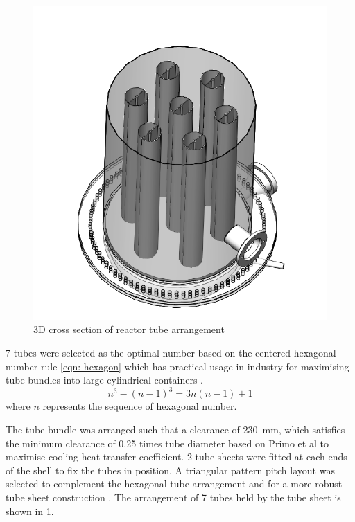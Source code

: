 \begin{figure}
    \centering
    \includegraphics[width=\linewidth]{chapters/2-reaction/figures/FYD reactor 7 tubes cross section 3D.PNG}
    \caption{3D cross section of reactor tube arrangement}
    \label{fig:reactortubearrangement}
\end{figure}
7 tubes were selected as the optimal number based on the centered hexagonal number rule \cref{eqn: hexagon} which has practical usage in industry for maximising tube bundles into large cylindrical containers \cite{noauthor_realiable_2018}. 
\begin{equation}
    n^3 - (n-1)^3 = 3n(n-1)+1
    \label{eqn: hexagon}
\end{equation}
where $n$ represents the sequence of hexagonal number. 

The tube bundle was arranged such that a clearance of \SI{230}{\milli \metre}, which satisfies the minimum clearance of 0.25 times tube diameter based on Primo et al \cite{primo_shell_2012} to maximise cooling heat transfer coefficient. 2 tube sheets were fitted at each ends of the shell to fix the tubes in position. A triangular pattern pitch layout was selected to complement the hexagonal tube arrangement and for a more robust tube sheet construction \cite{primo_shell_2012}. The arrangement of 7 tubes held by the tube sheet is shown in \cref{fig:reactortubearrangement}.

